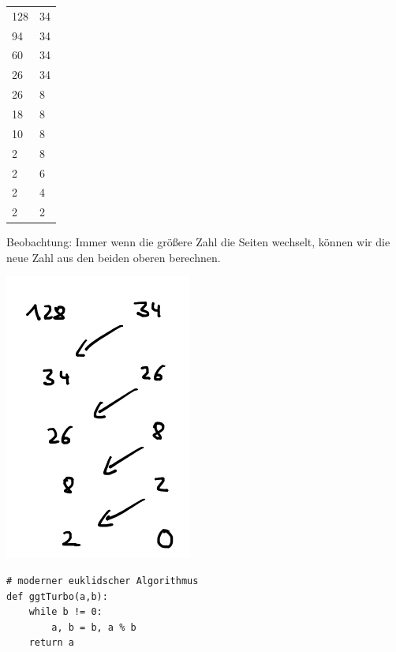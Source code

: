 \documentclass[10pt]{beamer}
\begin{document}
\begin{frame}[fragile]
\begin{minipage}[c]{3cm}      
\begin{tabular}{ll}
128  & 34 \\
94 & 34 \\ 
60  & 34 \\ 
26 & 34 \\ 
26 & 8 \\ 
18 & 8 \\ 
10 & 8 \\ 
2 & 8 \\ 
2 & 6 \\
2 & 4 \\
2 & 2 \\
\end{tabular}
\end{minipage}
\begin{minipage}[c]{7cm}      
Beobachtung: Immer wenn die größere Zahl die Seiten wechselt, können wir die neue Zahl aus den beiden oberen berechnen. \pause

\includegraphics[scale=0.5]{bild2.png} \pause

\begin{lstlisting} 
# moderner euklidscher Algorithmus
def ggtTurbo(a,b):  
    while b != 0:
        a, b = b, a % b
    return a
\end{lstlisting} 
\end{minipage}

\end{frame}
 
\end{document}
